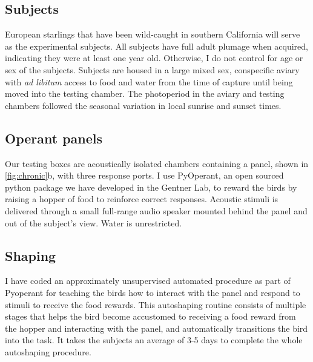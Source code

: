 \subsection*{Subjects}
European starlings that have been wild-caught in southern California will serve as the experimental subjects. All subjects have full adult plumage when acquired, indicating they were at least one year old. Otherwise, I do not control for age or sex of the subjects. Subjects are housed in a large mixed sex, conspecific aviary with \textit{ad libitum} access to food and water from the time of capture until being moved into the testing chamber. The photoperiod in the aviary and testing chambers followed the seasonal variation in local sunrise and sunset times.

\subsection*{Operant panels}
Our testing boxes are acoustically isolated chambers containing a panel, shown in \ref{fig:chronic}b, with three response ports. I use PyOperant, an open sourced python package we have developed in the Gentner Lab, to reward the birds by raising a hopper of food to reinforce correct responses. Acoustic stimuli is delivered through a small full-range audio speaker mounted behind the panel and out of the subject's view. Water is unrestricted.

\subsection*{Shaping}
I have coded an approximately unsupervised automated procedure as part of Pyoperant for teaching the birds how to interact with the panel and respond to stimuli to receive the food rewards. This autoshaping routine\cite{brown1968auto} consists of multiple stages that helps the bird become accustomed to receiving a food reward from the hopper and interacting with the panel, and automatically transitions the bird into the task. It takes the subjects an average of 3-5 days to complete the whole autoshaping procedure.


